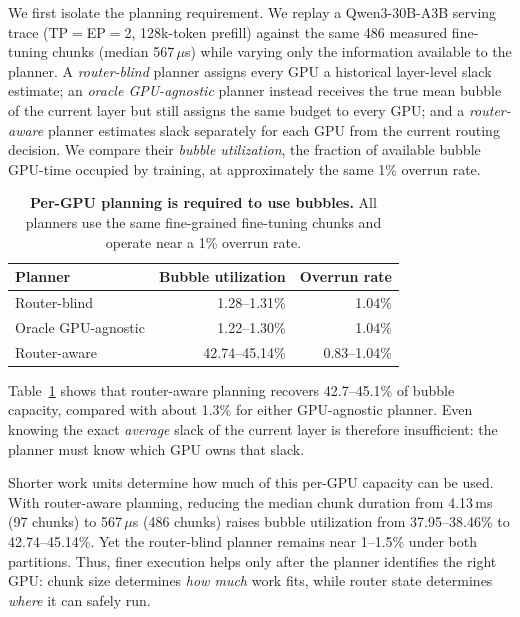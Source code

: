 We first isolate the planning requirement. We replay a
Qwen3-30B-A3B serving trace (\ac{TP}$=$\ac{EP}$=$2, 128k-token
prefill) against the same 486 measured fine-tuning chunks
(median 567\,$\mu$s) while varying only the information available to
the planner. A \emph{router-blind} planner assigns every GPU a
historical layer-level slack estimate; an \emph{oracle GPU-agnostic}
planner instead receives the true mean bubble of the current layer but
still assigns the same budget to every GPU; and a \emph{router-aware}
planner estimates slack separately for each GPU from the current
routing decision. We compare their \emph{bubble utilization}, the
fraction of available bubble GPU-time occupied by training, at
approximately the same 1\% overrun rate.

\begin{table}[t]
  \centering
  \small
  \caption{
    \textbf{Per-GPU planning is required to use bubbles.}
    All planners use the same fine-grained fine-tuning chunks and operate
    near a 1\% overrun rate.}

  \label{tab:gap-planner}
  \begin{tabular}{lrr}
    \toprule
    Planner & Bubble utilization & Overrun rate \\
    \midrule
    Router-blind
      & 1.28--1.31\% & 1.04\% \\
    Oracle GPU-agnostic
      & 1.22--1.30\% & 1.04\% \\
    Router-aware
      & 42.74--45.14\% & 0.83--1.04\% \\
    \bottomrule
  \end{tabular}
\end{table}

Table~\ref{tab:gap-planner} shows that router-aware planning recovers
42.7--45.1\% of bubble capacity, compared with about 1.3\% for either
GPU-agnostic planner. Even knowing the exact \emph{average} slack of
the current layer is therefore insufficient: the planner must know
which GPU owns that slack.

Shorter work units determine how much of this per-GPU capacity can be
used. With router-aware planning, reducing the median chunk duration
from 4.13\,ms (97 chunks) to 567\,$\mu$s (486 chunks) raises bubble
utilization from 37.95--38.46\% to 42.74--45.14\%. Yet the
router-blind planner remains near 1--1.5\% under both partitions.
Thus, finer execution helps only after the planner identifies the
right GPU: chunk size determines \emph{how much} work fits, while
router state determines \emph{where} it can safely run.
